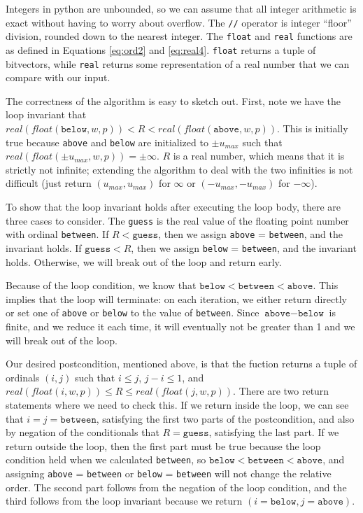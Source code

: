 \documentclass[letterpaper,10pt]{article}
\begin{document}
Integers in python are unbounded, so we can assume that all integer arithmetic is exact without having to worry about overflow. The \texttt{//} operator is integer ``floor'' division, rounded down to the nearest integer. The \texttt{float} and \texttt{real} functions are as defined in Equations \ref{eq:ord2} and \ref{eq:real4}. \texttt{float} returns a tuple of bitvectors, while \texttt{real} returns some representation of a real number that we can compare with our input.

The correctness of the algorithm is easy to sketch out. First, note we have the loop invariant that $real(float(\texttt{below}, w, p)) < R < real(float(\texttt{above}, w, p))$. This is initially true because \texttt{above} and \texttt{below} are initialized to $\pm u_{max}$ such that $real(float(\pm u_{max}, w, p)) = \pm \infty$. $R$ is a real number, which means that it is strictly not infinite; extending the algorithm to deal with the two infinities is not difficult (just return $(u_{max}, u_{max})$ for $\infty$ or $(-u_{max}, -u_{max})$ for $-\infty$).

To show that the loop invariant holds after executing the loop body, there are three cases to consider. The \texttt{guess} is the real value of the floating point number with ordinal \texttt{between}. If $R < \texttt{guess}$, then we assign \texttt{above} = \texttt{between}, and the invariant holds. If $\texttt{guess} < R$, then we assign \texttt{below} = \texttt{between}, and the invariant holds. Otherwise, we will break out of the loop and return early.

Because of the loop condition, we know that $\texttt{below} < \texttt{between} < \texttt{above}$. This implies that the loop will terminate: on each iteration, we either return directly or set one of \texttt{above} or \texttt{below} to the value of \texttt{between}. Since $\texttt{above} - \texttt{below}$ is finite, and we reduce it each time, it will eventually not be greater than 1 and we will break out of the loop.

Our desired postcondition, mentioned above, is that the fuction returns a tuple of ordinals $(i, j)$ such that $i \leq j$, $j-i \leq 1$, and $real(float(i, w, p)) \leq R \leq real(float(j, w, p))$. There are two return statements where we need to check this. If we return inside the loop, we can see that $i = j = \texttt{between}$, satisfying the first two parts of the postcondition, and also by negation of the conditionals that $R = \texttt{guess}$, satisfying the last part. If we return outside the loop, then the first part must be true because the loop condition held when we calculated \texttt{between}, so $\texttt{below} < \texttt{between} < \texttt{above}$, and assigning \texttt{above} = \texttt{between} or \texttt{below} = \texttt{between} will not change the relative order. The second part follows from the negation of the loop condition, and the third follows from the loop invariant because we return $(i=\texttt{below}, j=\texttt{above})$.
\end{document}
